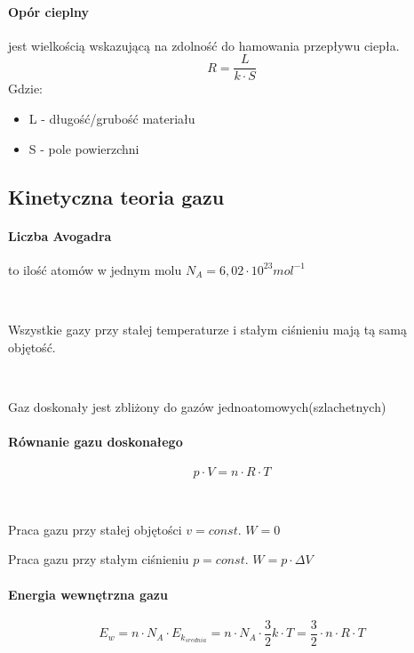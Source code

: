 \documentclass{article}
\begin{document}
            \paragraph{Opór cieplny}
                jest wielkością wskazującą na zdolność do hamowania przepływu
                ciepła.
                \begin{equation}
                    R = \frac{L}{k\cdotp S}
                \end{equation}
                Gdzie:
                \begin{itemize}
                    \item L - długość/grubość materiału
                    \item S - pole powierzchni
                \end{itemize}
        \subsection{Kinetyczna teoria gazu}
            \paragraph{Liczba Avogadra} to ilość atomów w jednym molu
                $N_A = 6,02 \cdotp 10^{23} {mol}^{-1}$

            \

            Wszystkie gazy przy stałej temperaturze i stałym ciśnieniu
            mają tą samą objętość.

            \
            
            Gaz doskonały jest zbliżony do gazów jednoatomowych(szlachetnych)

            \paragraph{Równanie gazu doskonałego}

            \begin{equation}
                p \cdotp V = n \cdotp R \cdotp T
            \end{equation}

            \
            
            Praca gazu przy stałej objętości
            $v = const. $
            $W = 0$

            Praca gazu przy stałym ciśnieniu
            $p = const. $
            $W = p \cdotp \Delta V$
        
            \paragraph{Energia wewnętrzna gazu}
            \begin{equation}
                E_w = n \cdotp N_A \cdotp E_{k_{srednia}} = n \cdotp N_A \cdotp
                \frac{3}{2} k \cdotp T = \frac{3}{2} \cdotp n \cdotp R \cdotp T
            \end{equation}
\end{document}
